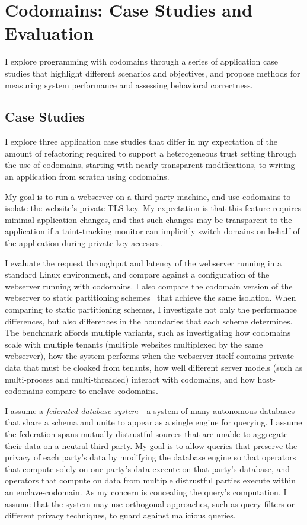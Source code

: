 \section{Codomains: Case Studies and Evaluation}
\label{sec:codomains-eval}

I explore programming with codomains through a series of application case
studies that highlight different scenarios and objectives, and propose methods
for measuring system performance and assessing behavioral correctness.


\subsection{Case Studies}

I explore three application case studies that differ in my expectation of the
amount of refactoring required to support a heterogeneous trust setting through
the use of codomains, starting with nearly transparent modifications, to
writing an application from scratch using codomains.


%
My goal is to run a webserver on a third-party machine, and use codomains to
isolate the website's private TLS key.
%
My expectation is that this feature requires minimal application changes,
and that such changes may be transparent to the application if a taint-tracking
monitor can implicitly switch domains on behalf of the application during
private key accesses.


I evaluate the request throughput and latency of the webserver running in a
standard Linux environment, and compare against a configuration of the
webserver running with codomains.
%
I also compare the codomain version of the webserver to 
static partitioning schemes~\cite{eleos,glamdring,privtrans} that achieve
the same isolation.
%
When comparing to static partitioning schemes, I investigate not only the
performance differences, but also differences in the boundaries that
each scheme determines.
%
The benchmark affords multiple variants, such as investigating how codomains
scale with multiple tenants (multiple websites multiplexed by the same
webserver), how the system performs when the webserver itself contains private
data that must be cloaked from tenants, how well different server models (such
as multi-process and multi-threaded) interact with codomains, and how
host-codomains compare to enclave-codomains.


%
I assume a \emph{federated database system}---a system of many
autonomous databases that share a schema and unite to appear as a single
engine for querying. 
%
I assume the federation spans mutually distrustful sources that are unable to 
aggregate their data on a neutral third-party.
%
My goal is to allow queries that preserve the privacy of each party's data by
modifying the database engine so that operators that compute solely on one
party's data execute on that party's database, and operators that compute on
data from multiple distrustful parties execute within an enclave-codomain.
%
As my concern is concealing the query's computation, I assume that the
system may use orthogonal approaches, such as query filters or different
privacy techniques, to guard against malicious queries.


